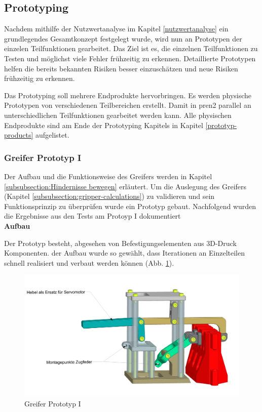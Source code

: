 \subsection{Prototyping}\label{prototyping}

Nachdem mithilfe der Nutzwertanalyse im Kapitel \ref{nutzwertanalyse} ein grundlegendes Gesamtkonzept festgelegt wurde, wird nun an Prototypen der einzelen Teilfunktionen gearbeitet. Das Ziel ist es, die einzelnen Teilfunktionen zu Testen und möglichst viele Fehler frühzeitig zu erkennen. Detaillierte Prototypen helfen die bereits bekannten Risiken besser einzuschätzen und neue Risiken frühzeitig zu erkennen.

Das Prototyping soll mehrere Endprodukte hervorbringen. Es werden physische Prototypen von verschiedenen Teilbereichen erstellt. Damit in \acrshort{pren2} parallel an unterschiedlichen Teilfunktionen gearbeitet werden kann. Alle physischen Endprodukte sind am Ende der Prototyping Kapitels in Kapitel \ref{prototyp-products} aufgelistet.

\subsubsection{Greifer Prototyp I}
\label{subsubsection:gripper-prototype-1}


Der Aufbau und die Funktionsweise des Greifers werden in Kapitel \ref{subsubsection:Hindernisse bewegen} erläutert. Um die Auslegung des Greifers (Kapitel \ref{subsubsection:gripper-calculations}) zu validieren und sein Funktionsprinzip zu überprüfen wurde ein Prototyp gebaut. Nachfolgend wurden die Ergebnisse aus den Tests am Protoyp I dokumentiert\\

\textbf{Aufbau}

 Der Prototyp besteht, abgesehen von Befestigungselementen aus 3D-Druck Komponenten. der Aufbau wurde so gewählt, dass Iterationen an Einzelteilen schnell realisiert und verbaut werden können (Abb. \ref{fig:gripper-prototype-1-trimetric-notes}). 

\begin{figure}[H]
\centering
\includegraphics[width=1.0\textwidth]{assets/greifer-prototyp/Greifer_Trimetrisch_Notes.png}
\caption{Greifer Prototyp I}
\label{fig:gripper-prototype-1-trimetric-notes}
\end{figure}

